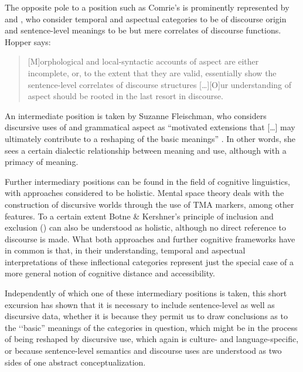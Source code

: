 The opposite pole to a position such as Comrie's is prominently represented by \citet{WeinreichH1964} and \citet{HopperP1982}, who consider temporal and aspectual categories to be of discourse origin and sentence-level meanings to be but mere correlates of discourse functions. Hopper says:
\begin{quote} {[M]orphological and local-syntactic accounts of aspect are either incomplete, or, to the extent that they are valid, essentially show the sentence-level correlates of discourse structures […][O]ur understanding of aspect should be rooted in the last resort in discourse. \citep[16]{HopperP1982}}\end{quote}

An intermediate position is taken by Suzanne Fleischman, who considers discursive uses of  and grammatical aspect as ``motivated extensions that […] may ultimately contribute to a reshaping of the basic meanings'' \citep[23]{FleischmanS1990}. In other words, she sees a certain dialectic relationship between meaning and use, although with a primacy of meaning.

Further intermediary positions can be found in the field of cognitive linguistics, with approaches considered to be holistic. Mental space theory \citep{FauconnierG1994} deals with the construction of discursive worlds through the use of TMA markers, among other features. To a certain extent Botne \& Kershner's principle of inclusion and exclusion () can also be understood as holistic, although no direct reference to discourse is made. What both approaches and further cognitive frameworks have in common is that, in their understanding, temporal and aspectual interpretations of these inflectional categories represent just the special case of a more general notion of cognitive distance and accessibility.

Independently of which one of these intermediary positions is taken, this short excursion has shown that it is necessary to include sentence-level as well as discursive data, whether it is because they permit us to draw conclusions as to the \lq\lq basic'' meanings of the categories in question, which might be in the process of being reshaped by discursive use, which again is culture- and language-specific, or because sentence-level semantics and discourse uses are understood as two sides of one abstract conceptualization.
